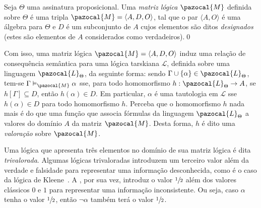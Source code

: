         \begin{definicao}
            Seja $\Theta$ uma assinatura proposicional. Uma \textit{matriz lógica} $\pazocal{M}$ definida sobre $\Theta$ é uma tripla $\pazocal{M} = \langle A, D, O \rangle$, tal que o par $\langle A, O \rangle$ é uma álgebra para $\Theta$ e $D$ é um subconjunto de $A$ cujos elementos são ditos \textit{designados} (estes são elementos de $A$ considerados como verdadeiros).\qed{}
        \end{definicao}

        Com isso, uma matriz lógica $\pazocal{M} = \langle A, D, O \rangle$ induz uma relação de consequência semântica para uma lógica tarskiana $\mathcal{L}$, definida sobre uma linguagem $\pazocal{L}_{\Theta}$, da seguinte forma: sendo $\Gamma \cup \{\alpha\} \in \pazocal{L}_{\Theta}$, tem-se $\Gamma \vDash_{\pazocal{M}} \alpha$ sse, para todo homomorfismo $h : \pazocal{L}_{\Theta} \to A$, se $h[\Gamma] \subseteq D$, então $h(\alpha) \in D$. Em particular, $\alpha$ é uma tautologia em $\mathcal{L}$ sse $h(\alpha) \in D$ para todo homomorfismo $h$. Perceba que o homomorfismo $h$ nada mais é do que uma função que associa fórmulas da linguagem $\pazocal{L}_{\Theta}$ a valores do domínio $A$ da matriz $\pazocal{M}$. Desta forma, $h$ é dito uma \textit{valoração} sobre $\pazocal{M}$.


       Uma lógica que apresenta três elementos no domínio de sua matriz lógica é dita \textit{trivalorada}. Algumas lógicas trivaloradas introduzem um terceiro valor além da verdade e falsidade para representar uma informação desconhecida, como é o caso da lógica de Kleene~\cite{manyvalued}. A \lfium{}, por sua vez, introduz o valor $\sfrac{1}{2}{}$ além dos valores clássicos $0$ e $1$ para representar uma informação inconsistente. Ou seja, caso $\alpha$ tenha o valor $\sfrac{1}{2}{}$, então $\neg \alpha$ também terá o valor $\sfrac{1}{2}{}$.


